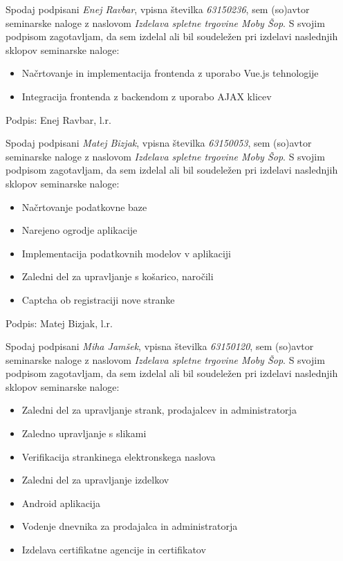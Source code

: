 \documentclass[a4paper,12pt]{report}
\newcommand{\naslov}     {Izdelava spletne trgovine Moby Šop}
\newcommand{\prviavtor}  {Enej Ravbar}
\newcommand{\prviindeks} {63150236}
\newcommand{\drugiavtor} {Matej Bizjak}
\newcommand{\drugiindeks}{63150053}
\newcommand{\tretjiavtor} {Miha Jamšek}
\newcommand{\tretjiindeks}{63150120}
\begin{document}
Spodaj podpisani \textit{\prviavtor}, vpisna številka \textit{\prviindeks}, sem (so)avtor seminarske naloge z naslovom \textit{\naslov}. S svojim podpisom zagotavljam, da sem izdelal ali bil soudeležen pri izdelavi naslednjih sklopov seminarske naloge:
\begin{itemize}
    \item Načrtovanje in implementacija frontenda z uporabo Vue.js tehnologije
    \item Integracija frontenda z backendom z uporabo AJAX klicev
\end{itemize}

Podpis: {\prviavtor}, l.r.

\newpage

Spodaj podpisani \textit{\drugiavtor}, vpisna številka \textit{\drugiindeks}, sem (so)avtor seminarske naloge z naslovom \textit{\naslov}. S svojim podpisom zagotavljam, da sem izdelal ali bil soudeležen pri izdelavi naslednjih sklopov seminarske naloge:
\begin{itemize}
    \item Načrtovanje podatkovne baze
    \item Narejeno ogrodje aplikacije
    \item Implementacija podatkovnih modelov v aplikaciji
    \item Zaledni del za upravljanje s košarico, naročili
    \item Captcha ob registraciji nove stranke
\end{itemize}

Podpis: {\drugiavtor}, l.r.

\newpage

Spodaj podpisani \textit{\tretjiavtor}, vpisna številka \textit{\tretjiindeks}, sem (so)avtor seminarske naloge z naslovom \textit{\naslov}. S svojim podpisom zagotavljam, da sem izdelal ali bil soudeležen pri izdelavi naslednjih sklopov seminarske naloge:
\begin{itemize}
    \item Zaledni del za upravljanje strank, prodajalcev in administratorja
    \item Zaledno upravljanje s slikami
    \item Verifikacija strankinega elektronskega naslova
    \item Zaledni del za upravljanje izdelkov
    \item Android aplikacija
    \item Vodenje dnevnika za prodajalca in administratorja
    \item Izdelava certifikatne agencije in certifikatov
\end{itemize}
\end{document}
